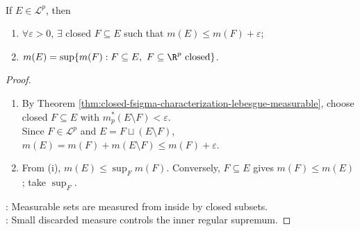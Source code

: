 \begin{corollary} \label{cor:closed-inner-regularity-lebesgue-measure} \\
If $E\in\mathcal{L}^p$, then
\begin{enumerate}[label=(\roman*)]
\setlength{\itemsep}{0pt}
\item $\forall\varepsilon>0$, $\exists$ closed $F\subseteq E$ such that $m(E)\leq m(F)+\varepsilon$;
\item $m(E)=\sup\{m(F):F\subseteq E,\ F\subseteq\R^p\text{ closed}\}$.
\end{enumerate}
\begin{proof}
\begin{enumerate}[label=(\roman*)]
\setlength{\itemsep}{0pt}
\item By Theorem \ref{thm:closed-fsigma-characterization-lebesgue-measurable}, choose closed $F\subseteq E$ with $m_p^\ast(E\setminus F)<\varepsilon$.\\
Since $F\in\mathcal{L}^p$ and $E=F\sqcup(E\setminus F)$, $m(E)=m(F)+m(E\setminus F)\leq m(F)+\varepsilon$.
\item From (i), $m(E)\leq\sup_Fm(F)$. Conversely, $F\subseteq E$ gives $m(F)\leq m(E)$; take $\sup_F$.
\end{enumerate}
: Measurable sets are measured from inside by closed subsets.\\
: Small discarded measure controls the inner regular supremum.
\end{proof}
\end{corollary}

